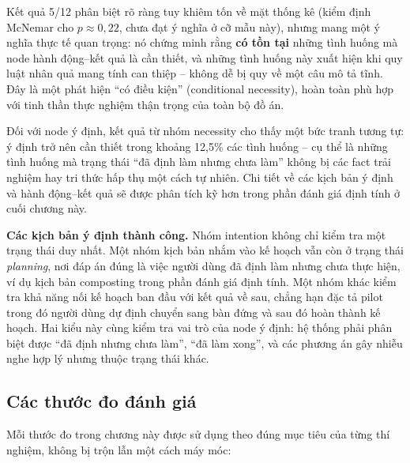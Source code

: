 \documentclass[../main.tex]{subfiles}
\begin{document}
Kết quả 5/12 phân biệt rõ ràng tuy khiêm tốn về mặt thống kê (kiểm định McNemar cho $p \approx 0{,}22$, chưa đạt ý nghĩa ở cỡ mẫu này), nhưng mang một ý nghĩa thực tế quan trọng: nó chứng minh rằng \textbf{có tồn tại} những tình huống mà node hành động--kết quả là cần thiết, và những tình huống này xuất hiện khi quy luật nhân quả mang tính can thiệp -- không dễ bị quy về một câu mô tả tĩnh. Đây là một phát hiện ``có điều kiện'' (conditional necessity), hoàn toàn phù hợp với tinh thần thực nghiệm thận trọng của toàn bộ đồ án.

Đối với node ý định, kết quả từ nhóm necessity cho thấy một bức tranh tương tự: ý định trở nên cần thiết trong khoảng 12,5\% các tình huống -- cụ thể là những tình huống mà trạng thái ``đã định làm nhưng chưa làm'' không bị các fact trải nghiệm hay tri thức hấp thụ một cách tự nhiên. Chi tiết về các kịch bản ý định và hành động--kết quả sẽ được phân tích kỹ hơn trong phần đánh giá định tính ở cuối chương này.

\textbf{Các kịch bản ý định thành công.} Nhóm intention không chỉ kiểm tra một trạng thái duy nhất. Một nhóm kịch bản nhắm vào kế hoạch vẫn còn ở trạng thái \textit{planning}, nơi đáp án đúng là việc người dùng đã định làm nhưng chưa thực hiện, ví dụ kịch bản composting trong phần đánh giá định tính. Một nhóm khác kiểm tra khả năng nối kế hoạch ban đầu với kết quả về sau, chẳng hạn đặc tả pilot trong đó người dùng dự định chuyển sang bàn đứng và sau đó hoàn thành kế hoạch. Hai kiểu này cùng kiểm tra vai trò của node ý định: hệ thống phải phân biệt được ``đã định nhưng chưa làm'', ``đã làm xong'', và các phương án gây nhiễu nghe hợp lý nhưng thuộc trạng thái khác.

\subsection{Các thước đo đánh giá}

Mỗi thước đo trong chương này được sử dụng theo đúng mục tiêu của từng thí nghiệm, không bị trộn lẫn một cách máy móc:
\end{document}
